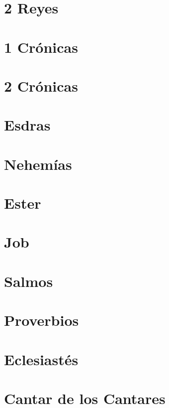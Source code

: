 \chapter{2 Reyes}



\chapter{1 Crónicas}



\chapter{2 Crónicas}



\chapter{Esdras}



\chapter{Nehemías}



\chapter{Ester}



\chapter{Job}



\chapter{Salmos}



\chapter{Proverbios}



\chapter{Eclesiastés}



\chapter{Cantar de los Cantares}



